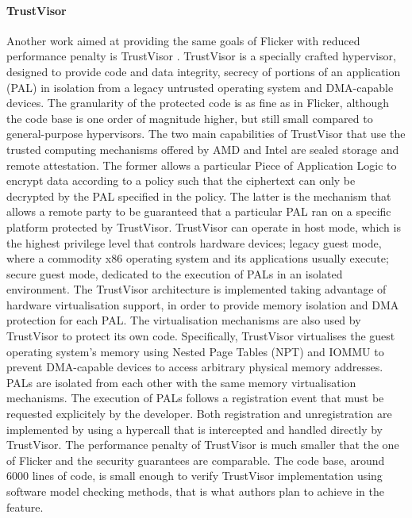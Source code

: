 \paragraph{TrustVisor}
Another work aimed at providing the same goals of Flicker with reduced performance penalty is TrustVisor \cite{TrustVisor}.
TrustVisor is a specially crafted hypervisor, designed to provide code and data integrity, secrecy of portions of an application (PAL) in isolation from a legacy untrusted operating system and DMA-capable devices.
The granularity of the protected code is as fine as in Flicker, although the code base is one order of magnitude higher, but still small compared to general-purpose hypervisors.
The two main capabilities of TrustVisor that use the trusted computing mechanisms offered by AMD and Intel are sealed storage and remote attestation. The former allows a particular Piece of Application Logic to encrypt data according to a policy such that the ciphertext can only be decrypted by the PAL specified in the policy. The latter is the mechanism that allows a remote party to be guaranteed that a particular PAL ran on a specific platform protected by TrustVisor.
TrustVisor can operate in host mode, which is the highest privilege level that controls hardware devices; legacy guest mode, where a commodity x86 operating system and its applications usually execute; secure guest mode, dedicated to the execution of PALs in an isolated environment.
The TrustVisor architecture is implemented taking advantage of hardware virtualisation support, in order to provide memory isolation and DMA protection for each PAL. The virtualisation mechanisms are also used by TrustVisor to protect its own code. Specifically, TrustVisor virtualises the guest operating system's memory using Nested Page Tables (NPT) and IOMMU to prevent DMA-capable devices to access arbitrary physical memory addresses.
PALs are isolated from each other with the same memory virtualisation mechanisms.
The execution of PALs follows a registration event that must be requested explicitely by the developer. Both registration and unregistration are implemented by using a hypercall that is intercepted and handled directly by TrustVisor.
The performance penalty of TrustVisor is much smaller that the one of Flicker and the security guarantees are comparable. The code base, around 6000 lines of code, is small enough to verify TrustVisor implementation using software model checking methods, that is what authors plan to achieve in the feature.



